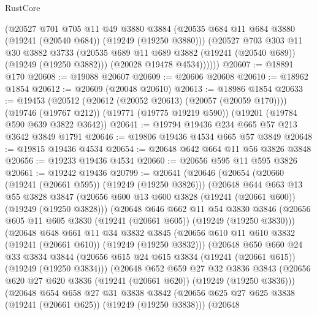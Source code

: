 \begin{lexlean}{RustCore}
\begin{coremodule}
          (@20527
            @701
            @705
            @11
            @49
            @3880
            @3884
            (@20535 @684 @11 @684 @3880 (@19241 (@20540 @684)) (@19249 (@19250 @3880)))
            (@20527
              @703
              @303
              @11
              @30
              @3882
              @3733
              (@20535 @689 @11 @689 @3882 (@19241 (@20540 @689)) (@19249 (@19250 @3882)))
              (@20028 @19478 @4534))))))
@20607 := @18891 @170
@20608 := @19088 @20607
@20609 := @20606 @20608
@20610 := @18962 @1854
@20612 := @20609 (@20048 @20610)
@20613 := @18986 @1854
@20633 := @19453
    (@20512 (@20612 (@20052 @20613) (@20057 (@20059 @170))))
    (@19746 (@19767 @212))
    (@19771 (@19775 @19219 @590))
    (@19201 (@19784 @590 @639 @3822 @3642))
@20641 := @19794 @19436 @234 @665 @57 @213 @3642 @3849 @1791
@20646 := @19806 @19436 @4534 @665 @57 @3849
@20648 := @19815 @19436 @4534
@20654 := @20648 @642 @664 @11 @56 @3826 @3848
@20656 := @19233 @19436 @4534
@20660 := @20656 @595 @11 @595 @3826
@20661 := @19242 @19436
@20799 := @20641
    (@20646
      (@20654
        (@20660 (@19241 (@20661 @595)) (@19249 (@19250 @3826)))
        (@20648
          @644
          @663
          @13
          @55
          @3828
          @3847
          (@20656 @600 @13 @600 @3828 (@19241 (@20661 @600)) (@19249 (@19250 @3828)))
          (@20648
            @646
            @662
            @11
            @54
            @3830
            @3846
            (@20656 @605 @11 @605 @3830 (@19241 (@20661 @605)) (@19249 (@19250 @3830)))
            (@20648
              @648
              @661
              @11
              @34
              @3832
              @3845
              (@20656 @610 @11 @610 @3832 (@19241 (@20661 @610)) (@19249 (@19250 @3832)))
              (@20648
                @650
                @660
                @24
                @33
                @3834
                @3844
                (@20656 @615 @24 @615 @3834 (@19241 (@20661 @615)) (@19249 (@19250 @3834)))
                (@20648
                  @652
                  @659
                  @27
                  @32
                  @3836
                  @3843
                  (@20656 @620 @27 @620 @3836 (@19241 (@20661 @620)) (@19249 (@19250 @3836)))
                  (@20648
                    @654
                    @658
                    @27
                    @31
                    @3838
                    @3842
                    (@20656 @625 @27 @625 @3838 (@19241 (@20661 @625)) (@19249 (@19250 @3838)))
                    (@20648

\end{coremodule}
\end{lexlean}
